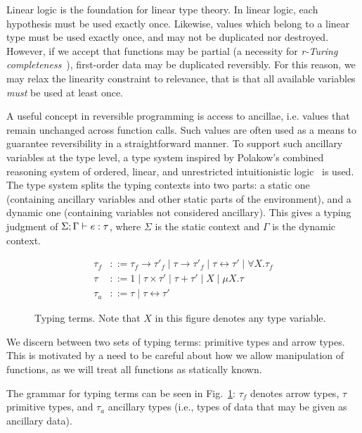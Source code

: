 Linear logic is the foundation for linear type theory. In linear logic, each
hypothesis must be used exactly once. Likewise, values which belong to a linear
type must be used exactly once, and may not be duplicated nor destroyed.
However, if we accept that functions may be partial (a necessity for
\emph{r-Turing completeness}~\cite{AxelsenGlueck:2016}), first-order data may
be duplicated reversibly. For this reason, we may relax the linearity
constraint to relevance, that is that all available variables \emph{must} be
used at least once.

A useful concept in reversible programming is access to ancillae, i.e. values
that remain unchanged across function calls. Such values are often used as a
means to guarantee reversibility in a straightforward manner.  To support such
ancillary variables at the type level, a type system inspired by Polakow’s
combined reasoning system of ordered, linear, and unrestricted intuitionistic
logic~\cite{Polakow:2001} is used. The type system splits the typing contexts
into two parts: a static one (containing ancillary variables and other static
parts of the environment), and a dynamic one (containing variables not
considered ancillary). This gives a typing judgment of $\Sigma;\Gamma\vdash e : \tau$, where
$\Sigma$ is the static context and $\Gamma$ is the dynamic context.

\begin{figure}[t]
\begin{align*}
  \tau_f & ::= \tau_f \rightarrow \tau'_f
        \mid \tau \rightarrow \tau'_f
        \mid \tau \leftrightarrow \tau' \mid \forall X. \tau_f \\
  \tau & ::=
  1 \mid \tau \times \tau' \mid \tau + \tau' \mid X \mid
           \mu X.\tau \\
  \tau_a & ::= \tau \mid \tau \leftrightarrow \tau'
\end{align*}
\caption{Typing terms. Note that $X$ in this figure denotes any type
variable.}\label{fig:typing}
\end{figure}

We discern between two sets of typing terms: primitive types and arrow types.
This is motivated by a need to be careful about how we allow manipulation of
functions, as we will treat all functions as statically known.

The grammar for typing terms can be seen in Fig.~\ref{fig:typing}: $\tau_f$
denotes arrow types, $\tau$ primitive types, and $\tau_a$ ancillary types
(i.e., types of data that may be given as ancillary data).

